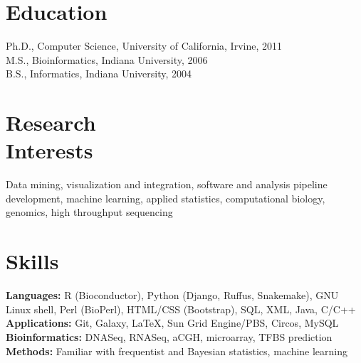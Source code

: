 \documentclass[margin,line]{res}
\begin{document}

\address{\textbf{E-mail:} kenny@kennydaily.net \textbf{Web:} www.kennydaily.net}
\address{10301 Grosvenor Place Apt 703, North Bethesda, MD 20852}

\begin{resume}



\section{Education}
Ph.D., Computer Science, University of California, Irvine, 2011\\%
M.S., Bioinformatics, Indiana University, 2006\\%
B.S., Informatics, Indiana University, 2004%

\section{Research\\Interests}
Data mining, visualization and integration, software and analysis pipeline development, machine learning, applied statistics, computational biology, genomics, high throughput sequencing

\section{Skills} 
\textbf{Languages:} R (Bioconductor), Python (Django, Ruffus, Snakemake), GNU Linux shell, Perl (BioPerl), HTML/CSS (Bootstrap), SQL, XML, Java, C/C++\\
\textbf{Applications:} Git, Galaxy, \LaTeX, Sun Grid Engine/PBS, Circos, MySQL\\
\textbf{Bioinformatics:} DNASeq, RNASeq, aCGH, microarray, TFBS prediction\\
\textbf{Methods:} Familiar with frequentist and Bayesian statistics, machine learning


\end{resume}
\end{document}
